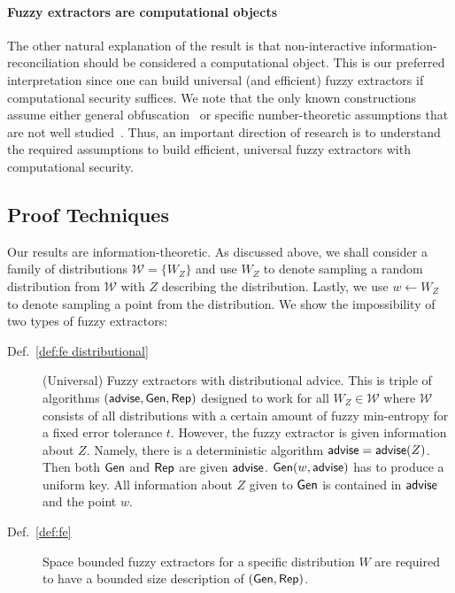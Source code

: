 \paragraph{Fuzzy extractors are computational objects} The other natural explanation of the result is that non-interactive information-reconciliation should be considered a computational object. This is our preferred interpretation since one can build universal (and efficient) fuzzy extractors if computational security suffices.  We note that the only known constructions assume either general obfuscation~\cite{BarakBCKPS13,BitanskyCKP14,bitansky2017virtual} or specific number-theoretic assumptions that are not well studied~\cite{galbraith2019obfuscated}. Thus, an important direction of research is to understand the required assumptions to build efficient, universal fuzzy extractors with computational security. 


\subsection{Proof Techniques}
Our results are information-theoretic. As discussed above, we shall
consider a family of distributions $\mathcal{W} = \{ W_Z \}$ and use $W_Z$ to
denote sampling a random distribution from $\mathcal{W}$ with $Z$
describing the distribution.  Lastly, we use $w\leftarrow W_Z$ to
denote sampling a point from the distribution.  We show the
impossibility of two types of fuzzy extractors:
\begin{description}
\item[Def.~\ref{def:fe distributional}] (Universal) Fuzzy extractors with distributional advice.  This is triple of algorithms $({\mathsf{advise}}, {\mathsf{Gen}}, {\mathsf{Rep}})$ designed to work for all $W_Z \in \mathcal{W}$ where $\mathcal{W}$ consists of all distributions with a certain amount of fuzzy min-entropy for a fixed error tolerance $t$.  However, the fuzzy extractor is given information about $Z$.  Namely, there is a deterministic algorithm ${\mathsf{advise}} = {\mathsf{advise}}(Z)$. Then both ${\mathsf{Gen}}$ and ${\mathsf{Rep}}$ are given ${\mathsf{advise}}$. ${\mathsf{Gen}}(w, {\mathsf{advise}})$ has to produce a uniform key.  All information about $Z$ given to ${\mathsf{Gen}}$ is contained in ${\mathsf{advise}}$ and the point $w$. 
\item[Def.~\ref{def:fe}] Space bounded fuzzy extractors for a specific distribution $W$ are required to have a bounded size description of $({\mathsf{Gen}}, {\mathsf{Rep}})$.
\end{description}


